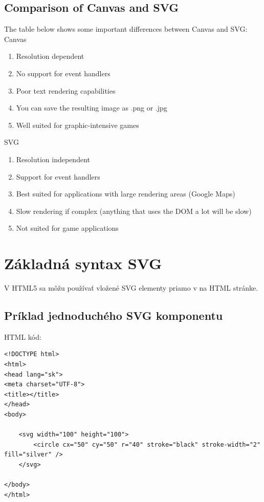  
 \subsection{Comparison of Canvas and SVG}
 The table below shows some important differences between Canvas and SVG:
 Canvas
 
 \begin{enumerate}
 	\item	Resolution dependent
 	\item	No support for event handlers
 	\item	Poor text rendering capabilities
 	\item	You can save the resulting image as .png or .jpg
 	\item	Well suited for graphic-intensive games
 \end{enumerate}	
 SVG
 
 \begin{enumerate}
 	\item	Resolution independent
 	\item	Support for event handlers
 	\item	Best suited for applications with large rendering areas (Google Maps)
 	\item	Slow rendering if complex (anything that uses the DOM a lot will be slow)
 	\item	Not suited for game applications
 \end{enumerate}
 
 
 
 
 \section{Základná syntax \acs*{SVG}}

V HTML5 sa môžu používať vložené SVG elementy priamo v na HTML stránke. 

\subsection{Príklad jednoduchého SVG komponentu}

HTML kód: 

\begin{lstlisting}
<!DOCTYPE html>
<html>
<head lang="sk">
<meta charset="UTF-8">
<title></title>
</head>
<body>

	<svg width="100" height="100">
		<circle cx="50" cy="50" r="40" stroke="black" stroke-width="2" fill="silver" />
	</svg>	
	
</body>
</html>

\end{lstlisting}


